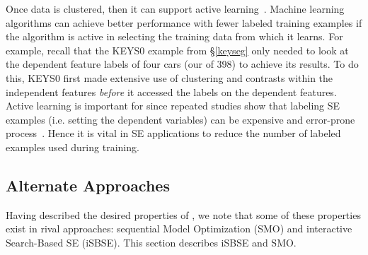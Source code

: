 Once data is clustered, then it can support active learning~\cite{settles2009active}.
Machine learning algorithms can achieve
better performance with fewer labeled training examples if the algorithm is active in selecting
the training data from which it learns. For example, recall that the KEYS0
example from \S\ref{keyseg} only needed to look at the 
dependent feature labels of four cars
(our of 398) to achieve its results. To do this, KEYS0 first
made extensive use of clustering and contrasts within
the independent features {\em before} it accessed the labels
on the dependent features. 
Active learning is important for {\IT}   since
repeated studies show that labeling SE examples (i.e. setting
the dependent variables) can be expensive and error-prone process~\cite{yu2020identifying,tu20}. Hence it is vital in SE applications
to reduce the number of labeled examples used during training. 
 
 \subsection{ Alternate Approaches}\label{aa}
 Having described the desired properties of {\IT},
 we note that some of these properties exist
 in rival approaches:  
sequential Model Optimization (SMO)
and interactive Search-Based 
SE (iSBSE). 
This section describes iSBSE and SMO.

